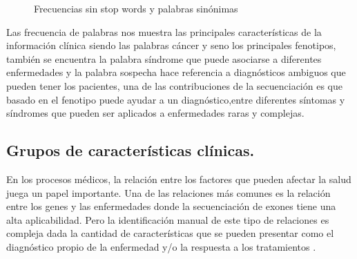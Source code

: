 \begin{figure}[]
	\centering
	\caption{Frecuencias sin stop words y palabras sinónimas} \label{fig:sin}
\end{figure} 

Las frecuencia de palabras nos muestra las principales características de la información clínica siendo las palabras cáncer y seno los principales fenotipos, también se encuentra la palabra síndrome que puede asociarse a diferentes  enfermedades y la palabra sospecha hace referencia a diagnósticos ambiguos que pueden tener los pacientes, una de las contribuciones de la secuenciación es que basado en el fenotipo puede ayudar a un diagnóstico,entre diferentes síntomas y síndromes que pueden ser aplicados a enfermedades raras y complejas\cite{Tetreault2015a}. \\

\subsection{Grupos de características clínicas.}

En los procesos médicos, la relación entre los factores que pueden afectar la salud juega un papel importante. Una de las relaciones más comunes es la relación entre los genes y las enfermedades donde la secuenciación de exones tiene una alta aplicabilidad. Pero la identificación manual de este tipo de relaciones es compleja dada la cantidad de características que se pueden presentar como el diagnóstico propio de la enfermedad y/o la respuesta a los tratamientos \cite{Kawashima2017}.\\

